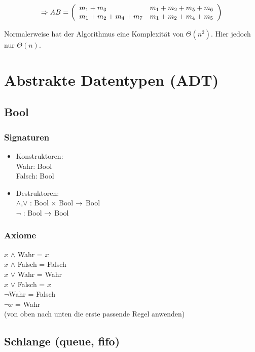 \documentclass[a4paper,twoside,DIV15,BCOR12mm]{scrbook}
\begin{document}
$$\Rightarrow AB = 
\left(\begin{array}{ll}
 m_1 + m_3 & m_1 + m_2 + m_5 + m_6 \\
 m_1 + m_2 + m_4 + m_7 & m_1 + m_2 + m_4 + m_5 \\
\end{array}\right)$$

Normalerweise hat der Algorithmus eine Komplexität von $\Theta(n^2)$. Hier jedoch nur $\Theta(n)$.


\section{Abstrakte Datentypen (ADT)}

\subsection{Bool}

\subsubsection*{Signaturen}
\begin{itemize}
	\item Konstruktoren:\\
Wahr: Bool 	\\
Falsch: Bool\\
	\item Destruktoren:\\
$\wedge$,$\vee$ : Bool $\times$ Bool $\rightarrow$ Bool\\
$\neg$ : Bool $\rightarrow$ Bool\\
\end{itemize}

\subsubsection*{Axiome}

$x$ $\wedge$ Wahr 	= $x$\\
$x$ $\wedge$ Falsch = Falsch\\
$x$ $\vee$ Wahr 	= Wahr\\
$x$ $\vee$ Falsch	= $x$\\
$\neg$Wahr = Falsch\\
$\neg x$ = Wahr\\
(von oben nach unten die erste passende Regel anwenden)
\subsection{Schlange (queue, fifo)}
\end{document}

